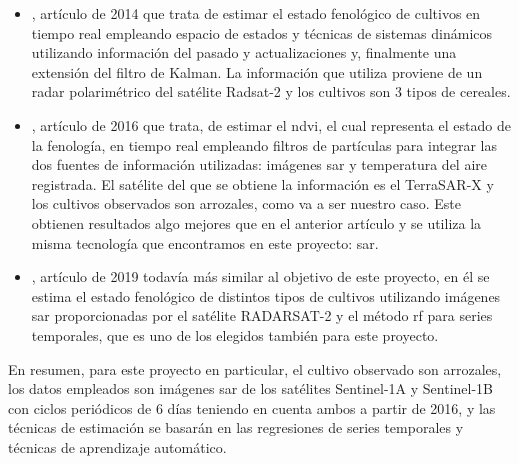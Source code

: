 \begin{itemize}
    \item \cite{Juanma2014}, artículo de 2014 que trata de estimar el estado fenológico de cultivos en tiempo real empleando espacio de estados y técnicas de sistemas dinámicos utilizando información del pasado y actualizaciones y, finalmente una extensión del filtro de Kalman. La información que utiliza proviene de un radar polarimétrico del satélite Radsat-2 y los cultivos son 3 tipos de cereales. 
    \\
    \item \cite{Juanma2016}, artículo de 2016 que trata, de estimar el \gls{ndvi}, el cual representa el estado de la fenología, en tiempo real empleando filtros de partículas para integrar las dos fuentes de información utilizadas: imágenes \gls{sar} y temperatura del aire registrada. El satélite del que se obtiene la información es el TerraSAR-X y los cultivos observados son arrozales, como va a ser nuestro caso. Este obtienen resultados algo mejores que en el anterior artículo y se utiliza la misma tecnología que encontramos en este proyecto: \gls{sar}. 
    \\
    \item \cite{artRF}, artículo de 2019 todavía más similar al objetivo de este proyecto, en él se estima el estado fenológico de distintos tipos de cultivos utilizando imágenes \gls{sar} proporcionadas por el satélite RADARSAT-2 y el método \gls{rf} para series temporales, que es uno de los elegidos también para este proyecto. 
\end{itemize} 

\par En resumen, para este proyecto en particular, el cultivo observado son arrozales, los datos empleados son imágenes \gls{sar} de los satélites Sentinel-1A y Sentinel-1B con ciclos periódicos de 6 días teniendo en cuenta ambos a partir de 2016, y las técnicas de estimación se basarán en las regresiones de series temporales y técnicas de aprendizaje automático. 
\\

